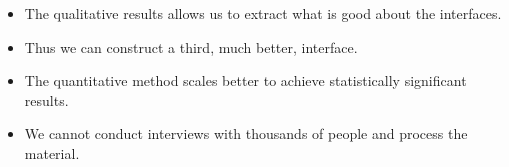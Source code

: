 \begin{frame}
  \begin{remark}
    \begin{itemize}
      \item The qualitative results allows us to extract what is good about the 
        interfaces.
      \item Thus we can construct a third, much better, interface.

        \pause

      \item The quantitative method scales better to achieve statistically 
        significant results.
      \item We cannot conduct interviews with thousands of people and process 
        the material.
    \end{itemize}
  \end{remark}
\end{frame}




\begin{frame}[allowframebreaks]
  \small
  \printbibliography
\end{frame}

